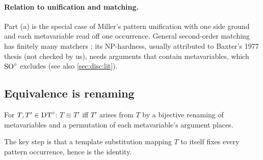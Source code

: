 \paragraph{Relation to unification and matching.}
Part (a) is the special case of Miller's pattern unification \citep{miller1991logic} with one side ground and each metavariable read off one occurrence. General second-order matching has finitely many matchers \citep{huet1978proving}; its NP-hardness, usually attributed to Baxter's 1977 thesis (not checked by us), needs arguments that contain metavariables, which $\mathrm{SO}^{\circ}$ excludes (see also \cref{sec:disc:lit}).

\subsection{Equivalence is renaming}\label{app:setting:renaming}

\begin{lemma}\label{lem:setting:renaming}
For $T,T'\in\mathrm{DT}^{\circ}$: $T\equiv T'$ iff $T'$ arises from $T$ by a bijective renaming of metavariables and a permutation of each metavariable's argument places.
\end{lemma}

The key step is that a template substitution mapping $T$ to itself fixes every pattern occurrence, hence is the identity.


